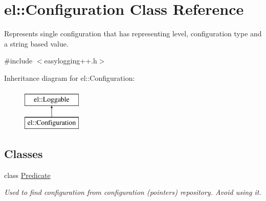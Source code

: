 \hypertarget{classel_1_1Configuration}{\section{el\-:\-:Configuration Class Reference}
\label{classel_1_1Configuration}
}


Represents single configuration that has representing level, configuration type and a string based value.  




{\ttfamily \#include $<$easylogging++.\-h$>$}

Inheritance diagram for el\-:\-:Configuration\-:\begin{figure}[H]
\begin{center}
\leavevmode
\includegraphics[height=2.000000cm]{classel_1_1Configuration}
\end{center}
\end{figure}
\subsection*{Classes}
\begin{DoxyCompactItemize}
\item 
class \hyperlink{classel_1_1Configuration_1_1Predicate}{Predicate}
\begin{DoxyCompactList}\small\item\em Used to find configuration from configuration (pointers) repository. Avoid using it. \end{DoxyCompactList}\end{DoxyCompactItemize}
